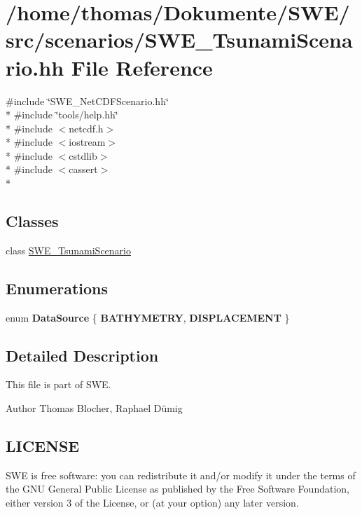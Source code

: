 \hypertarget{SWE__TsunamiScenario_8hh}{\section{/home/thomas/\-Dokumente/\-S\-W\-E/src/scenarios/\-S\-W\-E\-\_\-\-Tsunami\-Scenario.hh File Reference}
\label{SWE__TsunamiScenario_8hh}
}
{\ttfamily \#include \char`\"{}S\-W\-E\-\_\-\-Net\-C\-D\-F\-Scenario.\-hh\char`\"{}}\\*
{\ttfamily \#include \char`\"{}tools/help.\-hh\char`\"{}}\\*
{\ttfamily \#include $<$netcdf.\-h$>$}\\*
{\ttfamily \#include $<$iostream$>$}\\*
{\ttfamily \#include $<$cstdlib$>$}\\*
{\ttfamily \#include $<$cassert$>$}\\*
\subsection*{Classes}
\begin{DoxyCompactItemize}
\item 
class \hyperlink{classSWE__TsunamiScenario}{S\-W\-E\-\_\-\-Tsunami\-Scenario}
\end{DoxyCompactItemize}
\subsection*{Enumerations}
\begin{DoxyCompactItemize}
\item 
enum {\bfseries Data\-Source} \{ {\bfseries B\-A\-T\-H\-Y\-M\-E\-T\-R\-Y}, 
{\bfseries D\-I\-S\-P\-L\-A\-C\-E\-M\-E\-N\-T}
 \}
\end{DoxyCompactItemize}


\subsection{Detailed Description}
This file is part of S\-W\-E.

\begin{DoxyAuthor}{Author}
Thomas Blocher, Raphael Dümig
\end{DoxyAuthor}
\hypertarget{Writer_8hh_LICENSE}{}\subsection{L\-I\-C\-E\-N\-S\-E}\label{Writer_8hh_LICENSE}
S\-W\-E is free software\-: you can redistribute it and/or modify it under the terms of the G\-N\-U General Public License as published by the Free Software Foundation, either version 3 of the License, or (at your option) any later version.

